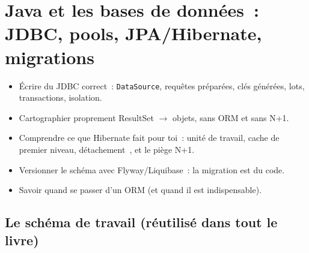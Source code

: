 \documentclass[12pt,a4paper,twoside,openright]{book}
\begin{document}
\chapter{Java et les bases de donn\'ees~: JDBC, pools, JPA/Hibernate, migrations}
\label{ch-java-db}

\begin{objectif}
\begin{itemize}
  \item \'Ecrire du JDBC correct~: \texttt{DataSource}, requ\^etes pr\'epar\'ees, cl\'es g\'en\'er\'ees, lots,
        transactions, isolation.
  \item Cartographier proprement ResultSet $\rightarrow$ objets, sans ORM et sans N+1.
  \item Comprendre ce que Hibernate fait pour toi~: unit\'e de travail, cache de premier niveau,
        \og d\'etachement~\fg{}, et le pi\`ege N+1.
  \item Versionner le sch\'ema avec Flyway/Liquibase~: la migration est du code.
  \item Savoir quand se passer d'un ORM (et quand il est indispensable).
\end{itemize}
\end{objectif}

\section{Le sch\'ema de travail (r\'eutilis\'e dans tout le livre)}
\end{document}
